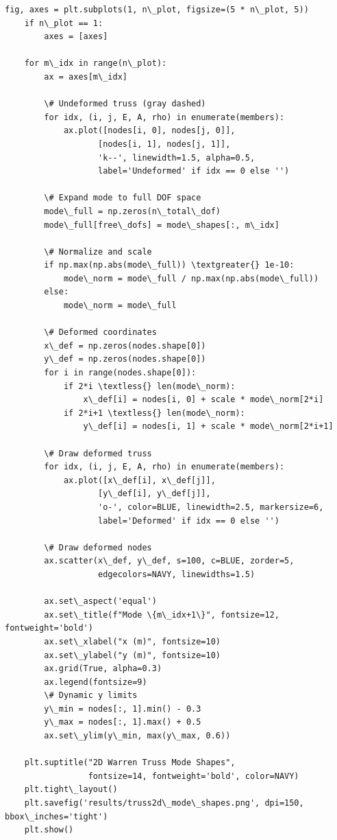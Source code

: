 \documentclass[12pt, a4paper]{article}
\begin{document}
\begin{lstlisting}[style=codestyle, caption={{visualize_truss2d.py --- 2D Warren Truss Visualizations}}]
    fig, axes = plt.subplots(1, n\_plot, figsize=(5 * n\_plot, 5))
    if n\_plot == 1:
        axes = [axes]

    for m\_idx in range(n\_plot):
        ax = axes[m\_idx]

        \# Undeformed truss (gray dashed)
        for idx, (i, j, E, A, rho) in enumerate(members):
            ax.plot([nodes[i, 0], nodes[j, 0]],
                   [nodes[i, 1], nodes[j, 1]],
                   'k--', linewidth=1.5, alpha=0.5,
                   label='Undeformed' if idx == 0 else '')

        \# Expand mode to full DOF space
        mode\_full = np.zeros(n\_total\_dof)
        mode\_full[free\_dofs] = mode\_shapes[:, m\_idx]

        \# Normalize and scale
        if np.max(np.abs(mode\_full)) \textgreater{} 1e-10:
            mode\_norm = mode\_full / np.max(np.abs(mode\_full))
        else:
            mode\_norm = mode\_full

        \# Deformed coordinates
        x\_def = np.zeros(nodes.shape[0])
        y\_def = np.zeros(nodes.shape[0])
        for i in range(nodes.shape[0]):
            if 2*i \textless{} len(mode\_norm):
                x\_def[i] = nodes[i, 0] + scale * mode\_norm[2*i]
            if 2*i+1 \textless{} len(mode\_norm):
                y\_def[i] = nodes[i, 1] + scale * mode\_norm[2*i+1]

        \# Draw deformed truss
        for idx, (i, j, E, A, rho) in enumerate(members):
            ax.plot([x\_def[i], x\_def[j]],
                   [y\_def[i], y\_def[j]],
                   'o-', color=BLUE, linewidth=2.5, markersize=6,
                   label='Deformed' if idx == 0 else '')

        \# Draw deformed nodes
        ax.scatter(x\_def, y\_def, s=100, c=BLUE, zorder=5,
                   edgecolors=NAVY, linewidths=1.5)

        ax.set\_aspect('equal')
        ax.set\_title(f"Mode \{m\_idx+1\}", fontsize=12, fontweight='bold')
        ax.set\_xlabel("x (m)", fontsize=10)
        ax.set\_ylabel("y (m)", fontsize=10)
        ax.grid(True, alpha=0.3)
        ax.legend(fontsize=9)
        \# Dynamic y limits
        y\_min = nodes[:, 1].min() - 0.3
        y\_max = nodes[:, 1].max() + 0.5
        ax.set\_ylim(y\_min, max(y\_max, 0.6))

    plt.suptitle("2D Warren Truss Mode Shapes",
                 fontsize=14, fontweight='bold', color=NAVY)
    plt.tight\_layout()
    plt.savefig('results/truss2d\_mode\_shapes.png', dpi=150, bbox\_inches='tight')
    plt.show()



\end{lstlisting}
\end{document}
